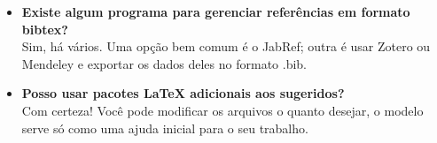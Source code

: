 \begin{itemize}
\item \textbf{Existe algum programa para gerenciar referências em formato bibtex?}\\
Sim, há vários. Uma opção bem comum é o JabRef; outra é usar Zotero ou Mendeley e exportar os dados deles no formato .bib.

\item \textbf{Posso usar pacotes \LaTeX{} adicionais aos sugeridos?}\\
Com certeza! Você pode modificar os arquivos o quanto desejar, o modelo serve só como uma ajuda inicial para o seu trabalho.

\end{itemize}
